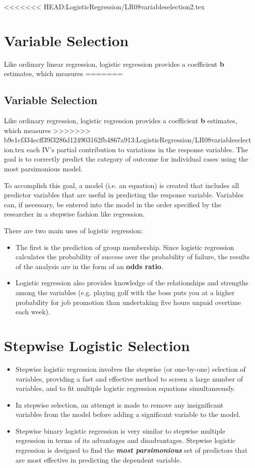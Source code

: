 \documentclass[a4paper,12pt]{article}
\begin{document}
<<<<<<< HEAD:LogisticRegression/LR08variableselection2.tex
\section*{Variable Selection}
Like ordinary linear regression, logistic regression provides a coefficient \textbf{b} estimates, which measures
=======
	
	\tableofcontents
\subsection{Variable Selection}
Like ordinary regression, logistic regression provides a coefficient \textbf{b} estimates, which measures
>>>>>>> b9e1cf334ecff39f3286d124903162fb4867a913:LogisticRegression/LR08variableselection.tex
each IV's partial contribution to variations in the response variables. The goal is to correctly predict
the category of outcome for individual cases using the most parsimonious model.

\noindent To accomplish this goal, a model (i.e. an equation) is created that includes all predictor variables that are useful in predicting the response variable. Variables can, if necessary, be entered into the model in the order specified by the researcher in a stepwise fashion like regression.


There are two main uses of logistic regression:
\begin{itemize}
	\item The first is the prediction of group membership. Since logistic regression calculates the
	probability of success over the probability of failure, the results of the analysis are in
	the form of an \textbf{odds ratio}.
	\item Logistic regression also provides knowledge of the relationships and strengths among
	the variables (e.g. playing golf with the boss puts you at a higher probability for job
	promotion than undertaking five hours unpaid overtime each week).
\end{itemize}


\section*{Stepwise Logistic Selection}
\begin{itemize}
\item Stepwise logistic regression involves the stepwise (or one-by-one) selection of variables,
	providing a fast and effective method to screen a large number of variables, and to fit
	multiple logistic regression equations simultaneously.
	
\item In stepwise selection, an attempt is made to remove any insignificant variables from the model before adding a significant variable to the model.
	
\item Stepwise binary logistic regression is very similar to stepwise multiple regression in terms of its advantages and disadvantages. Stepwise logistic regression is designed to find the \textbf{\textit{most parsimonious}} set of predictors that are most effective in predicting the dependent variable.
\end{itemize}
\end{document}
